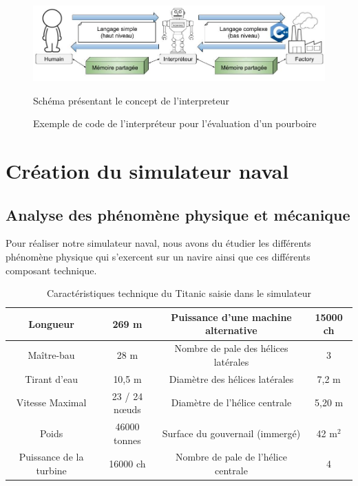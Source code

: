 \documentclass[a4paper,11pt]{article}
\begin{document}
    \begin{figure}[H]
        \begin{center}
            \caption{Schéma présentant le concept de l'interpreteur}
            \includegraphics[scale=0.5]{assets/Interpreteur_Dessin.jpg}
            \label{fig:interpreterDessin}
        \end{center}
    \end{figure}

    \begin{figure}[H]
        \begin{center}
            \caption{Exemple de code de l’interpréteur pour l’évaluation d'un pourboire}
            
            \label{fig:codeExemple}
        \end{center}
    \end{figure}

    \section{Création du simulateur naval}

    \subsection{Analyse des phénomène physique et mécanique}

    Pour réaliser notre simulateur naval, nous avons du étudier les différents phénomène physique qui s'exercent sur un navire ainsi que ces différents composant technique.

    \begin{table}[H]
        \caption{Caractéristiques technique du Titanic saisie dans le simulateur}
        \label{tab:TitanicData}

        \begin{center}
            \begin{tabular}{|c|c||c|c|}
                \hline
                Longueur & 269 m & Puissance d'une machine alternative & 15000 ch \tabularnewline
                \hline
                Maître-bau & 28 m & Nombre de pale des hélices latérales & 3 \tabularnewline
                \hline
                Tirant d'eau & 10,5 m & Diamètre des hélices latérales & 7,2 m \tabularnewline
                \hline
                Vitesse Maximal & 23 / 24 nœuds & Diamètre de l'hélice centrale & 5,20 m \tabularnewline
                \hline
                Poids & 46000 tonnes & Surface du gouvernail (immergé) & 42 m$^{2}$ \tabularnewline
                \hline
                Puissance de la turbine & 16000 ch & Nombre de pale de l'hélice centrale & 4 \tabularnewline
                \hline
            \end{tabular}
        \end{center}
    \end{table}
\end{document}
